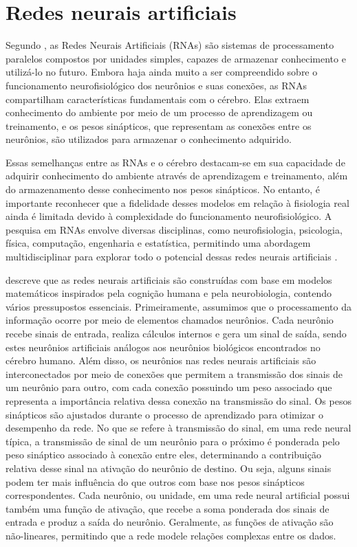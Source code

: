 \section{Redes neurais artificiais}
\label{sec:Redes neurais}

Segundo \textcite{haykin2001redes}, as Redes Neurais Artificiais (RNAs) são sistemas de processamento paralelos compostos por unidades simples, capazes de armazenar conhecimento e utilizá-lo no futuro. Embora haja ainda muito a ser compreendido sobre o funcionamento neurofisiológico dos neurônios e suas conexões, as RNAs compartilham características fundamentais com o cérebro. Elas extraem conhecimento do ambiente por meio de um processo de aprendizagem ou treinamento, e os pesos sinápticos, que representam as conexões entre os neurônios, são utilizados para armazenar o conhecimento adquirido.

Essas semelhanças entre as RNAs e o cérebro destacam-se em sua capacidade de adquirir conhecimento do ambiente através de aprendizagem e treinamento, além do armazenamento desse conhecimento nos pesos sinápticos. No entanto, é importante reconhecer que a fidelidade desses modelos em relação à fisiologia real ainda é limitada devido à complexidade do funcionamento neurofisiológico. A pesquisa em RNAs envolve diversas disciplinas, como neurofisiologia, psicologia, física, computação, engenharia e estatística, permitindo uma abordagem multidisciplinar para explorar todo o potencial dessas redes neurais artificiais \cite{haykin2001redes}.


\textcite{haykin2001redes} descreve que as redes neurais artificiais são construídas com base em modelos matemáticos inspirados pela cognição humana e pela neurobiologia, contendo vários pressupostos essenciais. Primeiramente, assumimos que o processamento da informação ocorre por meio de elementos chamados neurônios. Cada neurônio recebe sinais de entrada, realiza cálculos internos e gera um sinal de saída, sendo estes neurônios artificiais análogos aos neurônios biológicos encontrados no cérebro humano. Além disso, os neurônios nas redes neurais artificiais são interconectados por meio de conexões que permitem a transmissão dos sinais de um neurônio para outro, com cada conexão possuindo um peso associado que representa a importância relativa dessa conexão na transmissão do sinal. Os pesos sinápticos são ajustados durante o processo de aprendizado para otimizar o desempenho da rede. No que se refere à transmissão do sinal, em uma rede neural típica, a transmissão de sinal de um neurônio para o próximo é ponderada pelo peso sináptico associado à conexão entre eles, determinando a contribuição relativa desse sinal na ativação do neurônio de destino. Ou seja, alguns sinais podem ter mais influência do que outros com base nos pesos sinápticos correspondentes. Cada neurônio, ou unidade, em uma rede neural artificial possui também uma função de ativação, que recebe a soma ponderada dos sinais de entrada e produz a saída do neurônio. Geralmente, as funções de ativação são não-lineares, permitindo que a rede modele relações complexas entre os dados.

